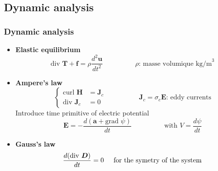 \documentclass[compress]{beamer}
\begin{document}
\subsection{Dynamic analysis}
\begin{frame}\frametitle{Dynamic analysis}
\begin{itemize}[label=$\bullet$, font=\small, leftmargin=*]
\item \textbf{Elastic equilibrium}
\begin{equation*}
	\text{div }\boldsymbol{T} + \boldsymbol{f} = \rho \frac{d^2 \boldsymbol{u}}{dt^2}
	\hspace{2cm} \rho \text{: masse volumique kg/m}^3
	\end{equation*}

\item \textbf{Ampere's law}
\begin{equation*}
				\left\{ 
				\begin{aligned}
				\text{curl } \boldsymbol{H} & = \boldsymbol{J}_c \\
				\text{div } \boldsymbol{J}_c & = 0
        		\end{aligned}
				\right.
				\hspace{2cm} \boldsymbol{J}_c = \sigma_c \boldsymbol{E} \text{: eddy currents}
	\end{equation*}
Introduce time primitive of electric potential
\begin{equation*}
\boldsymbol{E} = - \frac{d(\boldsymbol{a}+ \text{grad }\psi)}{dt}
\hspace{2cm} \text{with } V=\frac{d \psi}{dt}
\end{equation*}
\item \textbf{Gauss's law}
\begin{equation*}
\frac{d(\text{div } \boldsymbol{D})}{dt} = 0
\hspace{0.5cm} \text{for the symetry of the system} 
\end{equation*}
\end{itemize}
\end{frame}
\end{document}
